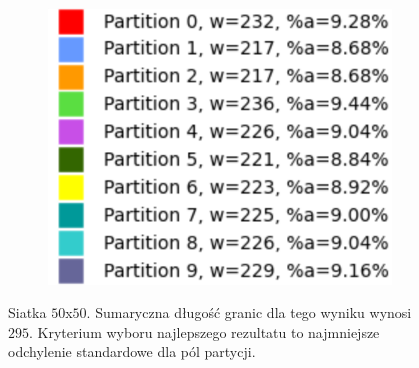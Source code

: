 \begin{figure}[h]
\begin{subfigure}{.33\textwidth}
\end{subfigure}%
\begin{subfigure}{.33\textwidth}
    \centering
    \includegraphics[width=0.9\linewidth]{images/results/m_k/with/11/results}
    \caption[short]{}
\end{subfigure}
\caption{Siatka $50$x$50$. Sumaryczna długość granic dla tego wyniku wynosi $295$.
Kryterium wyboru najlepszego rezultatu to najmniejsze odchylenie standardowe dla pól partycji.}
\label{result:11}
\end{figure}


